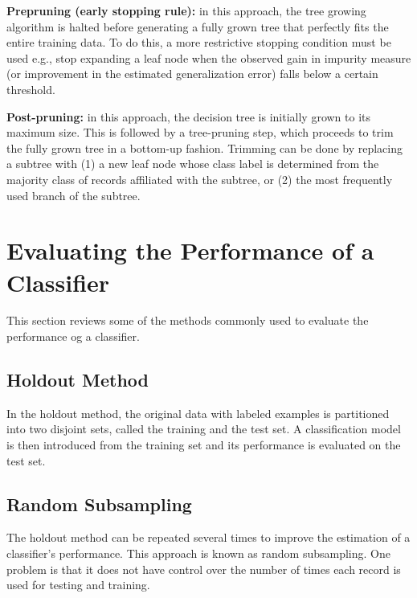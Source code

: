 		{\bf Prepruning (early stopping rule):} in this approach, the tree growing
		algorithm is halted before generating a fully grown tree that perfectly
		fits the entire training data. To do this, a more restrictive stopping condition
		must be used e.g., stop expanding a leaf node when the observed gain in
		impurity measure (or improvement in the estimated generalization error) falls
		below a certain threshold. 

		{\bf Post-pruning:} in this approach, the decision tree is initially grown 
		to its maximum size. This is followed by a tree-pruning step, which proceeds
		to trim the fully grown tree in a bottom-up fashion. Trimming can be done by
		replacing a subtree with (1) a new leaf node whose class label is determined
		from the majority class of records affiliated with the subtree, or (2) the most
		frequently used branch of the subtree. 


	\clearpage
	\section{Evaluating the Performance of a Classifier}

		This section reviews some of the methods commonly used to evaluate the 
		performance og a classifier. 

		\subsection*{Holdout Method}
		In the holdout method, the original data with labeled examples is
		partitioned into two disjoint sets, called the training and the test set.
		A classification model is then introduced from the training set and its
		performance is evaluated on the test set. 

		\subsection*{Random Subsampling}
		The holdout method can be repeated several times to improve the estimation
		of a classifier's performance. This approach is known as random subsampling.
		One problem is that it does not have control over the number of times
		each record is used for testing and training. 

